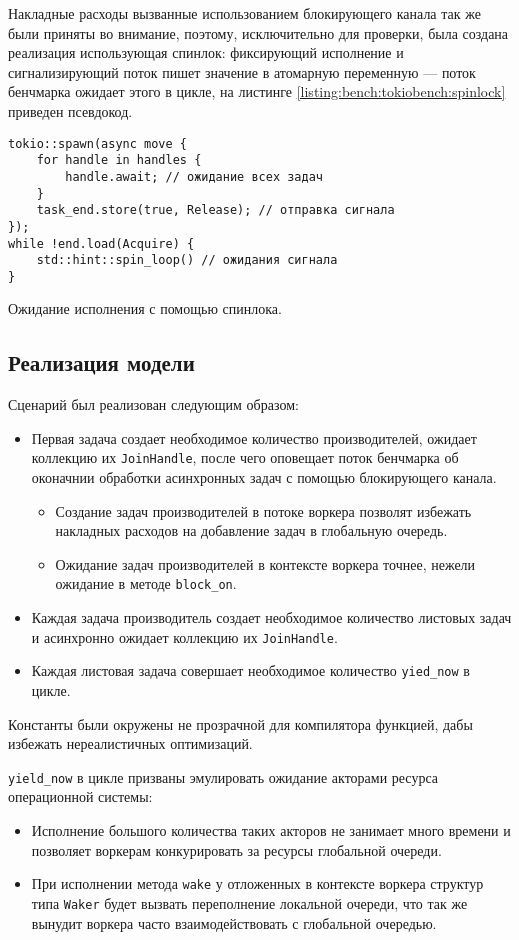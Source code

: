 Накладные расходы вызванные использованием блокирующего канала так же были приняты во внимание, поэтому, исключительно для проверки, была создана реализация использующая спинлок: фиксирующий исполнение и сигнализирующий поток пишет значение в атомарную переменную --- поток бенчмарка ожидает этого в цикле, на листинге \ref{listing:bench:tokiobench:spinlock} приведен псевдокод.

\begin{listing}[H]
    \begin{verbatim}
tokio::spawn(async move {
    for handle in handles {
        handle.await; // ожидание всех задач
    }
    task_end.store(true, Release); // отправка сигнала
});
while !end.load(Acquire) {
    std::hint::spin_loop() // ожидания сигнала
}
    \end{verbatim}
    \caption{Ожидание исполнения с помощью спинлока.}
    \label{listing:bench:tokiobench:spinlock}
\end{listing}

\subsection{Реализация модели}

Сценарий был реализован следующим образом:

\begin{itemize}
    \item Первая задача создает необходимое количество производителей, ожидает коллекцию их \verb|JoinHandle|, после чего оповещает поток бенчмарка об оконачнии обработки асинхронных задач с помощью блокирующего канала.
    \begin{itemize}
        \item Создание задач производителей в потоке воркера позволят избежать накладных расходов на добавление задач в глобальную очередь.
        \item Ожидание задач производителей в контексте воркера точнее, нежели ожидание в методе \verb|block_on|.
    \end{itemize}
    \item Каждая задача производитель создает необходимое количество листовых задач и асинхронно ожидает коллекцию их \verb|JoinHandle|.
    \item Каждая листовая задача совершает необходимое количество \verb|yied_now| в цикле.
\end{itemize}

Константы  были окружены не прозрачной для компилятора функцией, дабы избежать нереалистичных оптимизаций.

\verb|yield_now| в цикле призваны эмулировать ожидание акторами ресурса операционной системы:

\begin{itemize}
    \item Исполнение большого количества таких акторов не занимает много времени и позволяет воркерам конкурировать за ресурсы глобальной очереди.
    \item При исполнении метода \verb|wake| у отложенных в контексте воркера структур типа \verb|Waker| будет вызвать переполнение локальной очереди, что так же вынудит воркера часто взаимодействовать с глобальной очередью.
\end{itemize}
